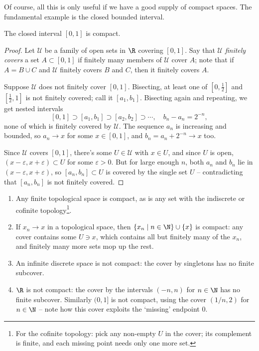 Of course, all this is only useful if we have a good supply of compact spaces. The fundamental example is the closed bounded interval.

\begin{theorem}[{$[0, 1]$ is Compact}]\label{thm:01compact}
    The closed interval $[0, 1]$ is compact.
\end{theorem}
\begin{proof}
    Let $\mathcal{U}$ be a family of open sets in $\R$ covering $[0, 1]$. Say that $\mathcal{U}$ \emph{finitely covers} a set $A \subset [0, 1]$ if finitely many members of $\mathcal{U}$ cover $A$; note that if $A = B \cup C$ and $\mathcal{U}$ finitely covers $B$ and $C$, then it finitely covers $A$.

    Suppose $\mathcal{U}$ does not finitely cover $[0, 1]$. Bisecting, at least one of $[0, \frac{1}{2}]$ and $[\frac{1}{2}, 1]$ is not finitely covered; call it $[a_1, b_1]$. Bisecting again and repeating, we get nested intervals
    $$
    [0,1] \supset [a_1, b_1] \supset [a_2, b_2] \supset \cdots, \quad b_n - a_n = 2^{-n},
    $$
    none of which is finitely covered by $\mathcal{U}$. The sequence $a_n$ is increasing and bounded, so $a_n \rightarrow x$ for some $x \in [0, 1]$, and $b_n = a_n + 2^{-n} \rightarrow x$ too.

    Since $\mathcal{U}$ covers $[0, 1]$, there's some $U \in \mathcal{U}$ with $x \in U$, and since $U$ is open, $(x - \varepsilon, x + \varepsilon) \subset U$ for some $\varepsilon > 0$. But for large enough $n$, both $a_n$ and $b_n$ lie in $(x - \varepsilon, x + \varepsilon)$, so $[a_n, b_n] \subset U$ is covered by the single set $U$ -- contradicting that $[a_n, b_n]$ is not finitely covered.
\end{proof}

\begin{example}
    \begin{enumerate}[label=(\roman*)]
        \item Any finite topological space is compact, as is any set with the indiscrete or cofinite topology\footnote{For the cofinite topology: pick any non-empty $U$ in the cover; its complement is finite, and each missing point needs only one more set.}.
        \item If $x_n \rightarrow x$ in a topological space, then $\{x_n \mid n \in \N\} \cup \{x\}$ is compact: any cover contains some $U \ni x$, which contains all but finitely many of the $x_n$, and finitely many more sets mop up the rest.
        \item An infinite discrete space is not compact: the cover by singletons has no finite subcover.
        \item $\R$ is not compact: the cover by the intervals $(-n, n)$ for $n \in \N$ has no finite subcover. Similarly $(0, 1]$ is not compact, using the cover $(1/n, 2)$ for $n \in \N$ -- note how this cover exploits the `missing' endpoint $0$.
    \end{enumerate}
\end{example}

